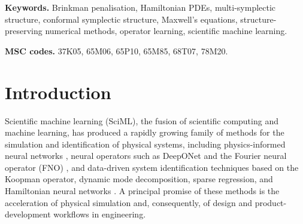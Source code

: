 \documentclass[11pt]{article}
\theoremstyle{definition}
\theoremstyle{remark}
\begin{document}
\begin{abstract}
Brinkman friction and Maxwell's equations penalised by an artificial
Ohmic conductivity both satisfy the compatibility condition, and the
respective modified densities are computed in closed form.  Building
on this structure we propose: (i) Structure-preserving numerical
integrators, obtained by composing the exactly solvable dissipative
flow with any multi-symplectic integrator via Strang splitting, which
satisfy a discrete conformal multi-symplectic conservation law, and
(ii) Conformal symplectic neural operators, a class of
operator-learning architectures that interleave learnable
multi-symplectic evolution operators with the exact penalisation
semigroup and hence inherit the conformal symplectic conservation law
by construction, for arbitrary domain geometries supplied through the
indicator function.  Numerical experiments on acoustic wave
propagation past obstacles and on electromagnetic scattering by
conducting obstacles in two and three dimensions---including a
cross-validation of the transverse magnetic Maxwell mode against the
penalised wave equation and operator-learning benchmarks with
airfoil-shaped scatterers and with families of random conducting
obstacles in three dimensions---demonstrate that the proposed methods
reproduce the correct local energy budget over long time horizons,
whereas standard integrators and Fourier neural operators exhibit
unphysical energy drift.  The framework also yields a principled
route to generating high-quality training data that satisfy physical
laws for scientific machine learning on complex domains.
\fi
\end{abstract}

\medskip
\noindent\textbf{Keywords.}
Brinkman penalisation, Hamiltonian PDEs, multi-symplectic structure,
conformal symplectic structure, Maxwell's equations,
structure-preserving numerical methods, operator learning, scientific
machine learning.

\smallskip
\noindent\textbf{MSC codes.} 37K05, 65M06, 65P10, 65M85, 68T07, 78M20.

\section{Introduction}
\label{sec:intro}

Scientific machine learning (SciML), the fusion of scientific
computing and machine learning, has produced a rapidly growing family
of methods for the simulation and identification of physical systems,
including physics-informed neural networks
\cite{raissi2019physics}, neural operators such as DeepONet
\cite{lu2021learning} and the Fourier neural operator (FNO)
\cite{li2021fourier}, and data-driven system identification techniques
based on the Koopman operator, dynamic mode decomposition, sparse
regression, and Hamiltonian neural networks
\cite{schmid2010dynamic,brunton2016discovering,greydanus2019hamiltonian}.
A principal promise of these methods is the acceleration of physical
simulation and, consequently, of design and product-development
workflows in engineering.
\end{document}
